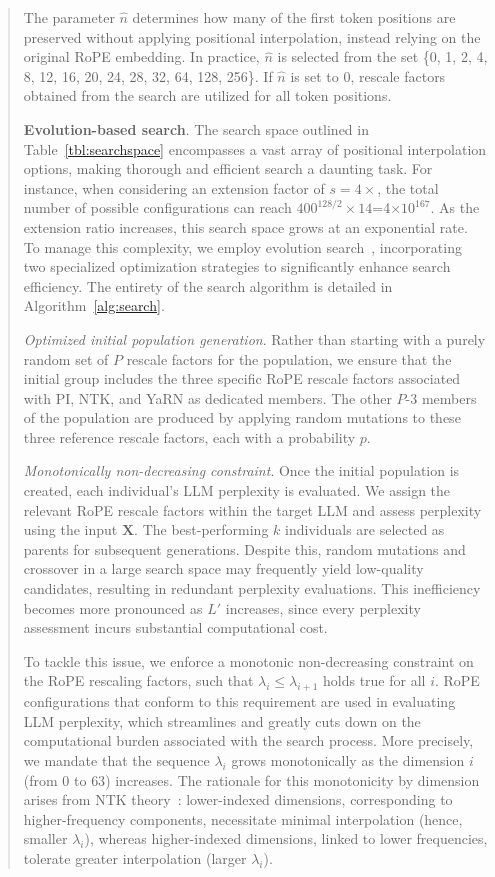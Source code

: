 \begin{abstract}
The parameter $\hat{n}$ determines how many of the first token positions are preserved without applying positional interpolation, instead relying on the original RoPE embedding. In practice, $\hat{n}$ is selected from the set \{0, 1, 2, 4, 8, 12, 16, 20, 24, 28, 32, 64, 128, 256\}. If $\hat{n}$ is set to 0, rescale factors obtained from the search are utilized for all token positions.

\textbf{Evolution-based search}. The search space outlined in Table~\ref{tbl:searchspace} encompasses a vast array of positional interpolation options, making thorough and efficient search a daunting task. For instance, when considering an extension factor of $s=4\times$, the total number of possible configurations can reach $400^{128/2}\times14$=4$\times10^{167}$. As the extension ratio increases, this search space grows at an exponential rate. To manage this complexity, we employ evolution search~\cite{guo2020single}, incorporating two specialized optimization strategies to significantly enhance search efficiency. The entirety of the search algorithm is detailed in Algorithm~\ref{alg:search}.

\textit{Optimized initial population generation}. Rather than starting with a purely random set of $P$ rescale factors for the population, we ensure that the initial group includes the three specific RoPE rescale factors associated with PI, NTK, and YaRN as dedicated members. The other $P$-3 members of the population are produced by applying random mutations to these three reference rescale factors, each with a probability $p$.

\textit{Monotonically non-decreasing constraint}. Once the initial population is created, each individual’s LLM perplexity is evaluated. We assign the relevant RoPE rescale factors within the target LLM and assess perplexity using the input $\mathbf{X}$. The best-performing $k$ individuals are selected as parents for subsequent generations. Despite this, random mutations and crossover in a large search space may frequently yield low-quality candidates, resulting in redundant perplexity evaluations. This inefficiency becomes more pronounced as $L'$ increases, since every perplexity assessment incurs substantial computational cost.

To tackle this issue, we enforce a monotonic non-decreasing constraint on the RoPE rescaling factors, such that $\lambda_i\le \lambda_{i+1}$ holds true for all $i$. RoPE configurations that conform to this requirement are used in evaluating LLM perplexity, which streamlines and greatly cuts down on the computational burden associated with the search process. More precisely, we mandate that the sequence $\lambda_i$ grows monotonically as the dimension $i$ (from $0$ to $63$) increases. The rationale for this monotonicity by dimension arises from NTK theory~\cite{jacot2018neural,tancik2020fourier,ntk}: lower-indexed dimensions, corresponding to higher-frequency components, necessitate minimal interpolation (hence, smaller $\lambda_i$), whereas higher-indexed dimensions, linked to lower frequencies, tolerate greater interpolation (larger $\lambda_i$).


\end{abstract}
